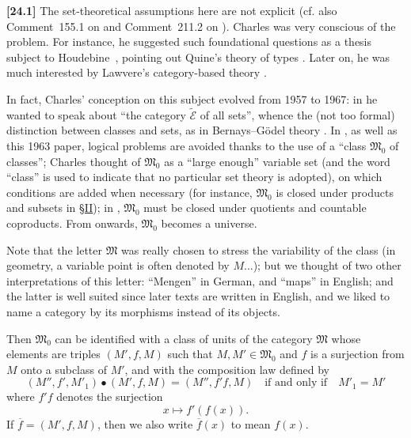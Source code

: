 \documentclass[a4paper,fleqn]{article}
\theoremstyle{plain}
\theoremstyle{definition}
\newenvironment{longcomm}[1]
  {\noindent\textbf{[#1]}\rmfamily}
  {}
\newcommand{\MM}{\mathfrak{M}}
\begin{document}
\begin{longcomm}{24.1}
  The set-theoretical assumptions here are not explicit (cf. also Comment~155.1 on \cite{coll66} and Comment~211.2 on \cite{coll100}).
  Charles was very conscious of the problem.
  For instance, he suggested such foundational questions as a thesis subject to Houdebine~\cite{comm55}, pointing out Quine's theory of types \cite{comm87}.
  Later on, he was much interested by Lawvere's category-based theory \cite{comm64}.

  In fact, Charles' conception on this subject evolved from 1957 to 1967: in \cite{coll47} he wanted to speak about ``the category $\widetilde{\mathcal{E}}$ of all sets'', whence the (not too formal) distinction between classes and sets, as in Bernays--Gödel theory \cite{comm10}.
  In \cite{coll55}, as well as this 1963 paper, logical problems are avoided thanks to the use of a ``class $\MM_0$ of classes'';
  Charles thought of $\MM_0$ as a ``large enough'' variable set (and the word ``class'' is used to indicate that no particular set theory is adopted), on which conditions are added when necessary (for instance, $\MM_0$ is closed under products and subsets in \hyperref[section:ii]{§II});
  in \cite{coll66,coll100}, $\MM_0$ must be closed under quotients and countable coproducts.
  From \cite{coll109} onwards, $\MM_0$ becomes a universe.

  Note that the letter $\MM$ was really chosen to stress the variability of the class (in geometry, a variable point is often denoted by $M$...);
  but we thought of two other interpretations of this letter: ``Mengen'' in German, and ``maps'' in English;
  and the latter is well suited since later texts are written in English, and we liked to name a category by its morphisms instead of its objects.
\end{longcomm}

Then $\MM_0$ can be identified with a class of units of the category $\MM$ whose elements are triples $(M',f,M)$ such that $M,M'\in\MM_0$ and $f$ is a surjection from $M$ onto a subclass of $M'$, and with the composition law defined by
\[
  (M'',f',M'_1)\bullet(M',f,M)
  = (M'',f'f,M)
  \quad\text{if and only if}\quad
  M'_1=M'
\]
where $f'f$ denotes the surjection
\[
  x\longmapsto f'(f(x)).
\]
If $\overline{f}=(M',f,M)$, then we also write $\overline{f}(x)$ to mean $f(x)$.
\end{document}
